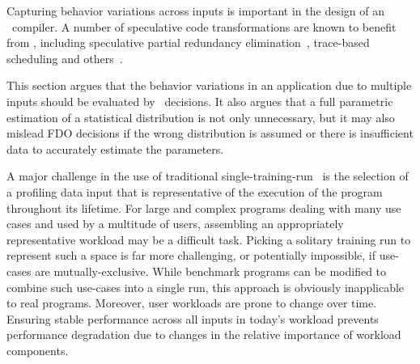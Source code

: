 

Capturing behavior variations across inputs is important in the design
of an \FDO\ compiler. A number of speculative code transformations are
known to benefit from \FDO, including speculative partial redundancy
elimination~\cite{ChowChanPLDI97,GuptaICCL98}, trace-based
scheduling and others~\cite{BodikGuptaPLDI97,ChekuriMICRO96}.%

This section argues that the behavior
variations in an application due to multiple inputs should be
evaluated by \FDO\ decisions.  It also argues that a full parametric
estimation of a statistical distribution is not only unnecessary, but
it may also mislead FDO decisions if the wrong distribution is assumed
or there is insufficient data to accurately estimate the
parameters.%


A major challenge in the use of traditional single-training-run \FDO\
is the selection of a profiling data input that is representative of
the execution of the program throughout its lifetime.  For large and
complex programs dealing with many use cases and used by a multitude
of users, assembling an appropriately representative workload may be a
difficult task.  Picking a solitary training run to represent such a
space is far more challenging, or potentially impossible, if use-cases
are mutually-exclusive.  While benchmark programs can be modified to
combine such use-cases into a single run, %
this approach is obviously inapplicable to real programs.  Moreover,
user workloads are prone to change over time.  Ensuring stable
performance across all inputs in today's workload prevents performance
degradation due to changes in the relative importance of workload
components.

